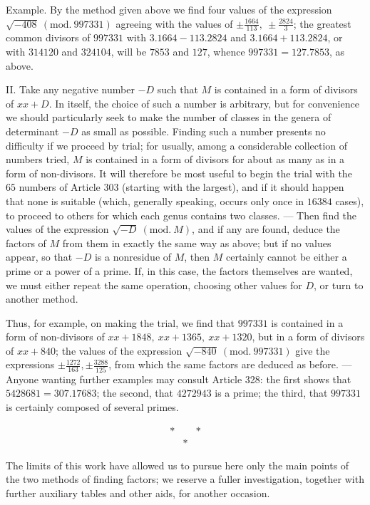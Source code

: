 Example. By the method given above we find four values of the expression \(\surd{-408}\ (\mathrm{mod.}\ 997331)\) agreeing with the values of \(\pm\frac{1664}{113},\allowbreak \ \pm\frac{2824}{3}\); the greatest common divisors of \(997331\) with \(3.1664-113.2824\) and \(3.1664+113.2824\), or with \(314120\) and \(324104\), will be \(7853\) and \(127\), whence \(997331=127.7853\), as above.

II. Take any negative number \(-D\) such that \(M\) is contained in a form of divisors of \(xx+D\). In itself, the choice of such a number is arbitrary, but for convenience we should particularly seek to make the number of classes in the genera of determinant \(-D\) as small as possible. Finding such a number presents no difficulty if we proceed by trial; for usually, among a considerable collection of numbers tried, \(M\) is contained in a form of divisors for about as many as in a form of non-divisors. It will therefore be most useful to begin the trial with the \(65\) numbers of Article 303 (starting with the largest), and if it should happen that none is suitable (which, generally speaking, occurs only once in \(16384\) cases), to proceed to others for which each genus contains two classes. — Then find the values of the expression \(\surd{-D}\ (\mathrm{mod.}\ M)\), and if any are found, deduce the factors of \(M\) from them in exactly the same way as above; but if no values appear, so that \(-D\) is a nonresidue of \(M\), then \(M\) certainly cannot be either a prime or a power of a prime. If, in this
case, the factors themselves are wanted, we must either repeat the same operation, choosing other values for \(D\), or turn to another method.

Thus, for example, on making the trial, we find that \(997331\) is contained in a form of non-divisors of \(xx+1848,\allowbreak \ xx+1365,\allowbreak \ xx+1320\), but in a form of divisors of \(xx+840\); the values of the expression \(\surd{-840}\ (\mathrm{mod.}\ 997331)\) give the expressions \(\pm\frac{1272}{163},\allowbreak \pm\frac{3288}{125}\), from which the same factors are deduced as before. — Anyone wanting further examples may consult Article 328: the first shows that \(5428681=307.17683\); the second, that \(4272943\) is a prime; the third, that \(997331\) is certainly composed of several primes.

\[\begin{array}{ccc}*& &*\\ &*&\end{array}\]

The limits of this work have allowed us to pursue here only the main points of the two methods of finding factors; we reserve a fuller investigation, together with further auxiliary tables and other aids, for another occasion.
\clearpage
